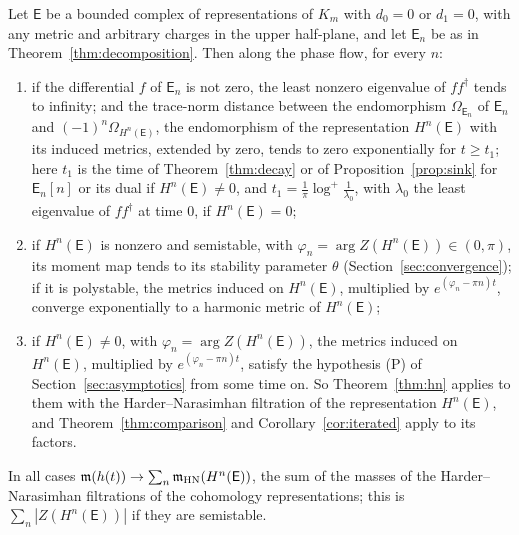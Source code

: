 \begin{theorem}\label{thm:longtime}
Let $\mathsf E$ be a bounded complex of representations of $K_m$ with
$d_0=0$ or $d_1=0$, with any metric and arbitrary charges in the upper
half-plane, and let $\mathsf E_n$ be as in
Theorem~\ref{thm:decomposition}. Then along the phase flow, for every $n$:
\begin{enumerate}
\item[(i)] if the differential $f$ of $\mathsf E_n$ is not zero, the least
 nonzero eigenvalue of $ff^\dagger$ tends to infinity; and the trace-norm
 distance between the endomorphism $\Omega_{\mathsf E_n}$ of $\mathsf E_n$
 and $(-1)^n\Omega_{H^n(\mathsf E)}$, the endomorphism of the representation
 $H^n(\mathsf E)$ with its induced metrics, extended by zero, tends to zero
 exponentially for $t\geq t_1$; here $t_1$ is the time of
 Theorem~\ref{thm:decay} or of Proposition~\ref{prop:sink} for
 $\mathsf E_n[n]$ or its dual if $H^n(\mathsf E)\neq0$, and
 $t_1=\frac1\pi\log^+\frac1{\lambda_0}$, with $\lambda_0$ the least
 eigenvalue of $ff^\dagger$ at time $0$, if $H^n(\mathsf E)=0$;
\item[(ii)] if $H^n(\mathsf E)$ is nonzero and semistable, with
 $\varphi_n=\arg Z(H^n(\mathsf E))\in(0,\pi)$, its moment map tends to its
 stability parameter $\theta$ (Section~\ref{sec:convergence}); if it is
 polystable, the metrics induced on $H^n(\mathsf E)$, multiplied by
 $e^{(\varphi_n-\pi n)t}$, converge exponentially to a harmonic metric of
 $H^n(\mathsf E)$;
\item[(iii)] if $H^n(\mathsf E)\neq0$, with
 $\varphi_n=\arg Z(H^n(\mathsf E))$, the metrics induced on
 $H^n(\mathsf E)$, multiplied by $e^{(\varphi_n-\pi n)t}$, satisfy the
 hypothesis (P) of Section~\ref{sec:asymptotics} from some time on. So
 Theorem~\ref{thm:hn} applies to them with the Harder--Narasimhan
 filtration of the representation $H^n(\mathsf E)$, and
 Theorem~\ref{thm:comparison} and Corollary~\ref{cor:iterated} apply to its
 factors.
\end{enumerate}
In all cases $\mathfrak m(h(t))\to\sum_n\mathfrak m_{\mathrm{HN}}(H^n(\mathsf E))$, the
sum of the masses of the Harder--Narasimhan filtrations of the cohomology
representations; this is $\sum_n|Z(H^n(\mathsf E))|$ if they are semistable.
\end{theorem}

